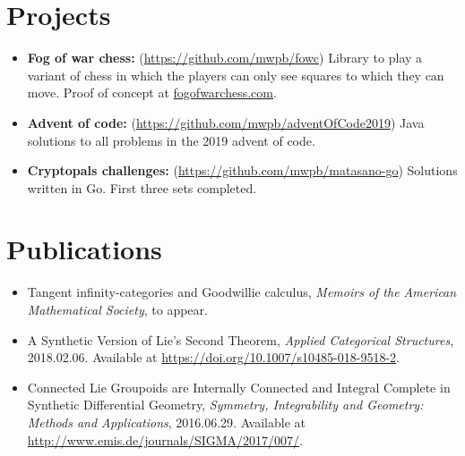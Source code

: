 \documentclass[11pt]{article}
\begin{document}
\section*{Projects}

\begin{itemize}
\item \textbf{Fog of war chess:} (\url{https://github.com/mwpb/fowc}) Library to play a variant of chess in which the players can only see squares to which they can move. Proof of concept at \href{https:fogofwarchess.com}{fogofwarchess.com}.
\item \textbf{Advent of code:} (\url{https://github.com/mwpb/adventOfCode2019}) Java solutions to all problems in the 2019 advent of code.
\item \textbf{Cryptopals challenges:} (\url{https://github.com/mwpb/matasano-go}) Solutions written in Go. First three sets completed.
\end{itemize}

\section*{Publications}

\begin{itemize}
  \item Tangent infinity-categories and Goodwillie calculus, \emph{Memoirs of the American Mathematical Society}, to appear.
  \item A Synthetic Version of Lie's Second Theorem, \emph{Applied Categorical Structures}, 2018.02.06. Available at \url{https://doi.org/10.1007/s10485-018-9518-2}.
  \item Connected Lie Groupoids are Internally Connected and Integral Complete in Synthetic Differential Geometry, \emph{Symmetry, Integrability and Geometry: Methods and Applications}, 2016.06.29. Available at \url{http://www.emis.de/journals/SIGMA/2017/007/}.
\end{itemize}
\end{document}

